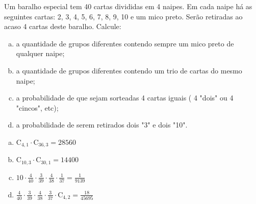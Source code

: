\begin{ex}
 Um baralho especial tem 40 cartas divididas em 4 naipes. Em cada naipe há as seguintes cartas: 2, 3, 4, 5, 6, 7, 8, 9, 10 e um mico preto. Serão retiradas ao acaso 4 cartas deste baralho. Calcule:
    \begin{enumerate}[(a)]
    \item a quantidade de grupos diferentes contendo sempre um mico preto de qualquer naipe;
    \item a quantidade de grupos diferentes contendo um trio de cartas do mesmo naipe;
    \item a probabilidade de que sejam sorteadas 4 cartas iguais ( 4 "dois" ou 4 "cincos", etc);
    \item a probabilidade de serem retirados dois "3" e dois "10".
    \end{enumerate}
     \begin{sol}
         \phantom{A} 
       \begin{enumerate} [(a)]
           \item $\mathrm{C}_{4,1}\cdot\mathrm{C}_{{36},3}=28560$
           \item $\mathrm{C}_{{10},3}\cdot\mathrm{C}_{{30},1}=14400$
           \item $10\cdot\frac{4}{40}\cdot\frac{3}{39}\cdot\frac{4}{38}\cdot\frac{1}{37}=\frac{1}{9139}$
           \item $\frac{4}{40}\cdot\frac{3}{39}\cdot\frac{4}{38}\cdot\frac{3}{37}\cdot\mathrm{C}_{4,2}=\frac{18}{45695}$
       \end{enumerate}
     \end{sol}
\end{ex}